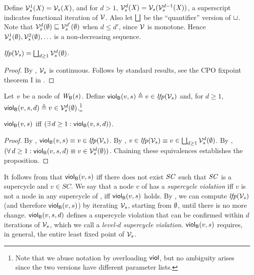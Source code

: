 Define $\VFsi{s}{\XS}{1} = \VFs{s}{\XS}$, and for $d > 1$, $\VFsi{s}{\XS}{d} =  \VFs{s}{ \VFsi{s}{\XS}{d-1} }$, 
\ie a superscript indicates functional iteration of $\VFsymb$. Also let $\JOIN$ be the ``quantifier'' version of $\join$.
Note that $\VFsi{s}{\ewfg}{d} \subg \VFsi{s}{\ewfg}{d'}$ when $d \le d'$, since $\VFsymb$
is monotone.
Hence $\VFsi{s}{\ewfg}{1}, \VFsi{s}{\ewfg}{2}, \ldots$ is a non-decreasing sequence.

\begin{proposition}  \label{prop:computeLFP}
$\lfp{\VFsymb_s} = \JOIN_{d \ge 1} \VFsi{s}{\ewfg}{d}$.
\end{proposition}
%
\begin{proof}
By , $\VFsymb_s$ is continuous. Follows by standard results, \eg see the CPO fixpoint theorem I in 
.
\end{proof}



\begin{definition}
\label{def:supercycle-violation}
\label{def:supercycle.violation}
\label{defn:supercycle.violation}
Let $\ndv$ be a node of $\wfg{\B}{s}$. Define
$\scV{v}{s} \df v \in \lfp{\VFsymb_s}$ and, for $d \ge 1$,
$\scVd{v}{d}{s} \df v \in \VFsi{s}{\ewfg}{d}$.\footnote{Note that
we abuse notation by overloading $\SMATHID{viol}$, but no ambiguity arises since the two versions have
different parameter lists.}
\end{definition}

\begin{proposition}
\label{prop:globViol-equiv-globViolDist}
$\scV{\ndv}{s}$ iff  $(\ex d \ge 1: \scVd{\ndv}{d}{s})$.
\end{proposition}
%
\begin{proof}
By , $\scV{\ndv}{s} \ev \ndv \in \lfp{\VFsymb_s}$.
By , $\ndv \in \lfp{\VFsymb_s} \ev v \in \JOIN_{d \ge 1} \VFsi{s}{\ewfg}{d}$.
By , $(\fa d \ge 1: \scVd{v}{d}{s} \ev v \in \VFsi{s}{\ewfg}{d})$.
Chaining these equivalences establishes the proposition.
\end{proof}
%
It follows from  that $\scV{v}{s}$ iff there does not exist $\SC$ such that $\SC$ is a supercycle and $v \in SC$.
We say that a node $v$ of  has a \emph{supercycle violation} %
iff $v$ is not a node in any supercycle of , 
\ie iff $\scV{v}{s}$ holds. 
By , we can compute $\lfp{\VFsymb_s}$ (and therefore $\scV{v}{s}$) by iterating $\VFsymb_s$, starting from $\ewfg$, until there is no more change.
$\scVd{v}{d}{s}$ defines a supercycle violation that can be confirmed within $d$ iterations of $\VFsymb_s$, which we call a \emph{level-$d$ supercycle violation}.
$\scV{v}{s}$ requires, in general, the entire least fixed point of $\VFsymb_s$.


